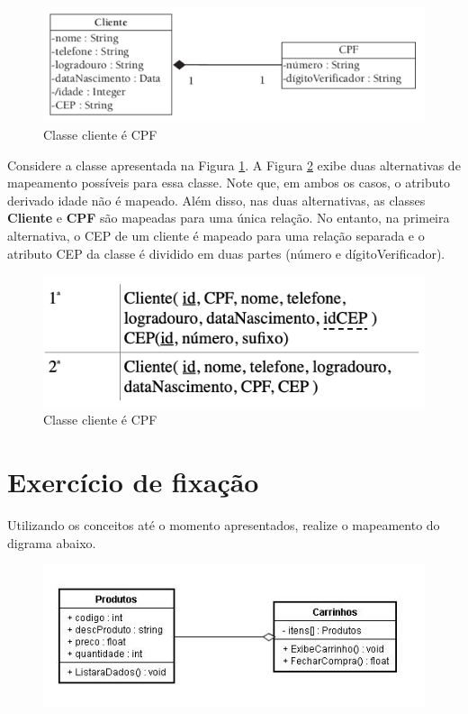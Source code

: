 \begin{figure}[H]
	\centering
	\includegraphics[scale=0.6]{imagens/mapeamento01.png}
	\caption{Classe cliente é CPF}
	\label{fig:figura-01-banco-02}
\end{figure}

Considere a classe apresentada na Figura \ref{fig:figura-01-banco-02}. A Figura \ref{fig:figura-01-banco-03} exibe duas alternativas de mapeamento possíveis para essa classe. Note que, em ambos os casos, o atributo derivado idade não é mapeado. Além disso, nas duas alternativas, as classes \textbf{Cliente} e \textbf{CPF} são mapeadas para uma única relação. No entanto, na primeira alternativa, o CEP de um cliente é mapeado para uma relação separada e o atributo CEP da classe é dividido em duas partes (número e dígitoVerificador).

\begin{figure}[H]
	\centering
	\includegraphics[scale=0.6]{imagens/mapeamento02.png}
	\caption{Classe cliente é CPF}
	\label{fig:figura-01-banco-03}
\end{figure}

\section{Exercício de fixação}

Utilizando os conceitos até o momento apresentados, realize o mapeamento do digrama abaixo.

\begin{figure}[H]
	\centering
	\includegraphics[scale=0.8]{imagens/agregacao22.jpg}
\end{figure}

